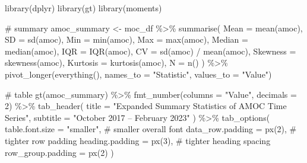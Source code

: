 \documentclass[
  11pt,
]{article}
\newenvironment{Shaded}{\begin{snugshade}}{\end{snugshade}}
\newcommand{\AttributeTok}[1]{\textcolor[rgb]{0.40,0.45,0.13}{#1}}
\newcommand{\CommentTok}[1]{\textcolor[rgb]{0.37,0.37,0.37}{#1}}
\newcommand{\DecValTok}[1]{\textcolor[rgb]{0.68,0.00,0.00}{#1}}
\newcommand{\FunctionTok}[1]{\textcolor[rgb]{0.28,0.35,0.67}{#1}}
\newcommand{\NormalTok}[1]{\textcolor[rgb]{0.00,0.23,0.31}{#1}}
\newcommand{\OtherTok}[1]{\textcolor[rgb]{0.00,0.23,0.31}{#1}}
\newcommand{\SpecialCharTok}[1]{\textcolor[rgb]{0.37,0.37,0.37}{#1}}
\newcommand{\StringTok}[1]{\textcolor[rgb]{0.13,0.47,0.30}{#1}}
\begin{document}
\begin{Shaded}
\begin{Highlighting}[]
\FunctionTok{library}\NormalTok{(dplyr)}
\FunctionTok{library}\NormalTok{(gt)}
\FunctionTok{library}\NormalTok{(moments)}

\CommentTok{\# summary}
\NormalTok{amoc\_summary }\OtherTok{\textless{}{-}}\NormalTok{ moc\_df }\SpecialCharTok{\%\textgreater{}\%}
  \FunctionTok{summarise}\NormalTok{(}
    \AttributeTok{Mean =} \FunctionTok{mean}\NormalTok{(amoc),}
    \AttributeTok{SD =} \FunctionTok{sd}\NormalTok{(amoc),}
    \AttributeTok{Min =} \FunctionTok{min}\NormalTok{(amoc),}
    \AttributeTok{Max =} \FunctionTok{max}\NormalTok{(amoc),}
    \AttributeTok{Median =} \FunctionTok{median}\NormalTok{(amoc),}
    \AttributeTok{IQR =} \FunctionTok{IQR}\NormalTok{(amoc),}
    \AttributeTok{CV =} \FunctionTok{sd}\NormalTok{(amoc) }\SpecialCharTok{/} \FunctionTok{mean}\NormalTok{(amoc),}
    \AttributeTok{Skewness =} \FunctionTok{skewness}\NormalTok{(amoc),}
    \AttributeTok{Kurtosis =} \FunctionTok{kurtosis}\NormalTok{(amoc),}
    \AttributeTok{N =} \FunctionTok{n}\NormalTok{()}
\NormalTok{  ) }\SpecialCharTok{\%\textgreater{}\%}
  \FunctionTok{pivot\_longer}\NormalTok{(}\FunctionTok{everything}\NormalTok{(), }\AttributeTok{names\_to =} \StringTok{"Statistic"}\NormalTok{, }\AttributeTok{values\_to =} \StringTok{"Value"}\NormalTok{)}

\CommentTok{\# table}
\FunctionTok{gt}\NormalTok{(amoc\_summary) }\SpecialCharTok{\%\textgreater{}\%}
  \FunctionTok{fmt\_number}\NormalTok{(}\AttributeTok{columns =} \StringTok{"Value"}\NormalTok{, }\AttributeTok{decimals =} \DecValTok{2}\NormalTok{) }\SpecialCharTok{\%\textgreater{}\%}
  \FunctionTok{tab\_header}\NormalTok{(}
    \AttributeTok{title =} \StringTok{"Expanded Summary Statistics of AMOC Time Series"}\NormalTok{,}
    \AttributeTok{subtitle =} \StringTok{"October 2017 – February 2023"}
\NormalTok{  ) }\SpecialCharTok{\%\textgreater{}\%}
  \FunctionTok{tab\_options}\NormalTok{(}
    \AttributeTok{table.font.size =} \StringTok{"smaller"}\NormalTok{,        }\CommentTok{\# smaller overall font}
    \AttributeTok{data\_row.padding =} \FunctionTok{px}\NormalTok{(}\DecValTok{2}\NormalTok{),           }\CommentTok{\# tighter row padding}
    \AttributeTok{heading.padding =} \FunctionTok{px}\NormalTok{(}\DecValTok{3}\NormalTok{),            }\CommentTok{\# tighter heading spacing}
    \AttributeTok{row\_group.padding =} \FunctionTok{px}\NormalTok{(}\DecValTok{2}\NormalTok{)}
\NormalTok{  )}
\end{Highlighting}
\end{Shaded}
\end{document}
